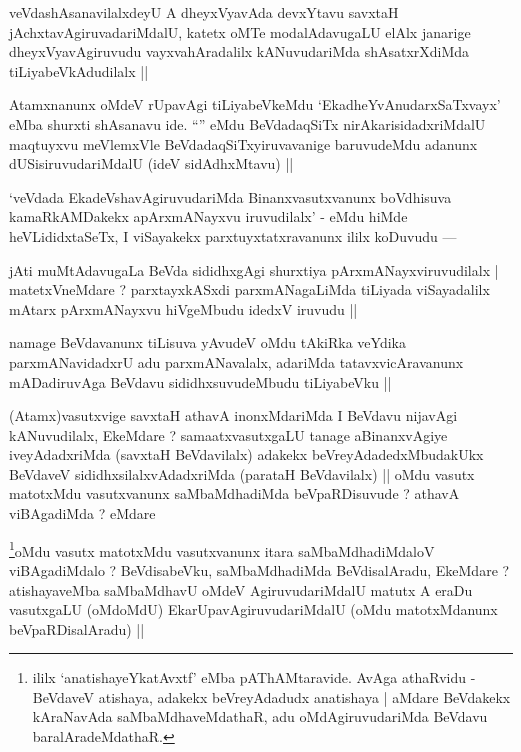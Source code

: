 \begin{artha}
veVdashAsanavilalxdeyU A dheyxVyavAda devxYtavu savxtaH jAchxtavAgiruvadariMdalU, katetx oMTe modalAdavugaLU elAlx janarige dheyxVyavAgiruvudu vayxvahAradalilx kANuvudariMda shAsatxrXdiMda tiLiyabeVkAdudilalx ||
\end{artha}

\begin{artha}
Atamxnanunx oMdeV rUpavAgi tiLiyabeVkeMdu `EkadheYvAnudarxSaTxvayx' eMba shurxti shAsanavu ide. ``\stext'' eMdu BeVdadaqSiTx nirAkarisidadxriMdalU maqtuyxvu meVlemxVle BeVdadaqSiTxyiruvavanige baruvudeMdu adanunx dUSisiruvudariMdalU (ideV sidAdhxMtavu) ||
\end{artha}


\begin{artha}
`veVdada EkadeVshavAgiruvudariMda Binanxvasutxvanunx boVdhisuva kamaRkAMDakekx apArxmANayxvu iruvudilalx' - eMdu hiMde heVLididxtaSeTx, I viSayakekx parxtuyxtatxravanunx ililx koDuvudu ---
\end{artha}

\begin{artha}
jAti muMtAdavugaLa BeVda sididhxgAgi shurxtiya pArxmANayxviruvudilalx | matetxVneMdare ? parxtayxkASxdi parxmANagaLiMda tiLiyada viSayadalilx mAtarx pArxmANayxvu hiVgeMbudu idedxV iruvudu ||
\end{artha}


\begin{artha}
namage BeVdavanunx tiLisuva yAvudeV oMdu tAkiRka veYdika parxmANavidadxrU adu parxmANavalalx, adariMda tatavxvicAravanunx mADadiruvAga BeVdavu sididhxsuvudeMbudu tiLiyabeVku ||
\end{artha}

\begin{artha}
(Atamx)vasutxvige savxtaH athavA inonxMdariMda I BeVdavu nijavAgi kANuvudilalx, EkeMdare ? samaatxvasutxgaLU tanage aBinanxvAgiye iveyAdadxriMda (savxtaH BeVdavilalx) adakekx beVreyAdadedxMbudakUkx BeVdaveV sididhxsilalxvAdadxriMda (parataH BeVdavilalx) || oMdu vasutx matotxMdu vasutxvanunx saMbaMdhadiMda beVpaRDisuvude ? athavA viBAgadiMda ? eMdare 
\end{artha}

\begin{artha}
\footnote{ililx `anatishayeYkatAvxtf' eMba pAThAMtaravide. AvAga athaRvidu - BeVdaveV atishaya, adakekx beVreyAdadudx anatishaya | aMdare BeVdakekx kAraNavAda saMbaMdhaveMdathaR, adu oMdAgiruvudariMda BeVdavu baralAradeMdathaR.}oMdu vasutx matotxMdu vasutxvanunx itara saMbaMdhadiMdaloV viBAgadiMdalo ? BeVdisabeVku, saMbaMdhadiMda BeVdisalAradu, EkeMdare ? atishayaveMba saMbaMdhavU oMdeV AgiruvudariMdalU matutx A eraDu vasutxgaLU (oMdoMdU) EkarUpavAgiruvudariMdalU (oMdu matotxMdanunx beVpaRDisalAradu) ||
\end{artha}

